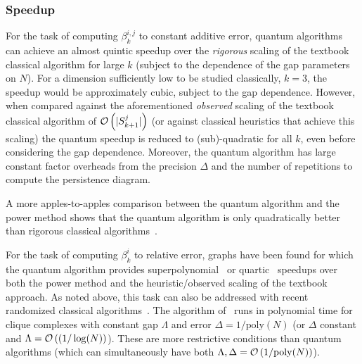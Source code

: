 \begin{refsection}
\subsubsection*{Speedup}
For the task of computing $\beta_k^{i,j}$ to constant additive error, quantum algorithms can achieve an almost quintic speedup over the \textit{rigorous} scaling of the textbook classical algorithm for large $k$ (subject to the dependence of the gap parameters on $N$). For a dimension sufficiently low to be studied classically, $k=3$, the speedup would be approximately cubic, subject to the gap dependence. However, when compared against the aforementioned \textit{observed} scaling of the textbook classical algorithm of $\mathcal{O}\left( |S_{k+1}^j| \right)$ (or against classical heuristics that achieve this scaling) the quantum speedup is reduced to (sub)-quadratic for all $k$, even before considering the gap dependence. Moreover, the quantum algorithm has large constant factor overheads from the precision $\Delta$ and the number of repetitions to compute the persistence diagram.

A more apples-to-apples comparison between the quantum algorithm and the power method shows that the quantum algorithm is only quadratically better than rigorous classical algorithms~\cite{friedman1998computingbetti,mcardle2022streamlinedTDA}.

For the task of computing $\beta_k^i$ to relative error, graphs have been found for which the quantum algorithm provides superpolynomial~\cite{berry2022quantifyingTDA} or quartic~\cite{berry2022quantifyingTDA,schmidhuber2022complexityTDA} speedups over both the power method and the heuristic/observed scaling of the textbook approach. As noted above, this task can also be addressed with recent randomized classical algorithms~\cite{berry2022quantifyingTDA,apers2022SimpleBetti}. The algorithm of~\cite{apers2022SimpleBetti} runs in polynomial time for clique complexes with constant gap $\Lambda$ and error $\Delta = 1/\mathrm{poly}(N)$ (or $\Delta$ constant and $\Lambda = \mathcal{O}\left( (1/\log(N) \right)$). These are more restrictive conditions than quantum algorithms (which can simultaneously have both $\Lambda, \Delta = \mathcal{O}\left( 1/\mathrm{poly}(N) \right)$).





\end{refsection}
